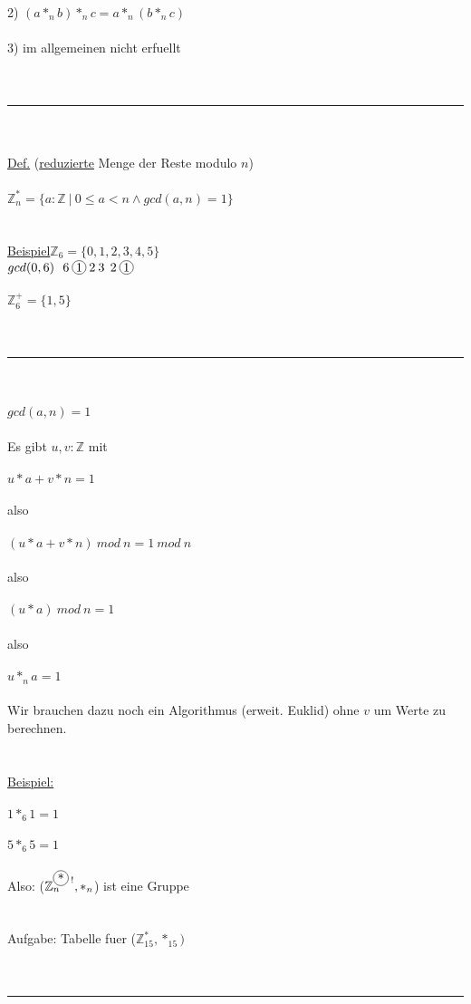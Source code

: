 \documentclass[18pt,a4paper]{article}
\newcommand*\circled[1]{\tikz[baseline=(char.base)]{
            \node[shape=circle,draw,inner sep=1pt] (char) {#1};}}
\newcommand{\tab}{\hspace*{2em}}
\begin{document}
2) $(a *_n b) *_n c = a *_n (b *_n c)$\\
\\
3) im allgemeinen nicht erfuellt\\
\\
\\
\rule{\textwidth}{0.4mm}\\
\\
\uline{Def.} (\uline{reduzierte} Menge der Reste modulo $n$)\\
\\
\tab $\mathbb{Z}_{n}^{*} = \{ a:\mathbb{Z}\:\vert\: 0 \leqslant a< n \wedge gcd(a,n) = 1\}$\\
\\
\\
\uline{Beispiel}\tab $\mathbb{Z}_6 = \{0,1,2,3,4,5\}$ \\
\tab \tab $gcd(0,6)\:\:\:6\: \circled{1}\: 2\: 3\:\: 2\: \circled{1}$\\
\\
\tab \tab $\mathbb{Z}_{6}^{+} = \{1,5\}$\\
\\
\\
\rule{\textwidth}{0.4mm}\\
\\
$gcd(a,n) = 1$\\
\\
Es gibt $u,v : \mathbb{Z}$ mit\\
\\
\tab $u*a + v*n =1$\\
\\
also\\
\\
\tab $(u*a + v*n)\: mod\: n =1 \: mod \: n$\\
\\
also\\
\\
\tab $(u*a)\: mod\: n =1$\\
\\
also\\
\\
\tab $u *_n a =1$\\
\\
Wir brauchen dazu noch ein Algorithmus (erweit. Euklid) ohne $v$ um Werte zu berechnen.\\
\\
\\
\uline{Beispiel:}\\
\\
$1 *_6 1 =1$\\
\\
$5 *_6 5 =1$\\
\\
Also: ($\mathbb{Z}_{n}^{\circled{*}\:!}, *_n$) ist eine Gruppe\\
\\
\\
Aufgabe: Tabelle fuer ($\mathbb{Z}_{15}^{*}, *_{15})$\\
\\
\\
\rule{\textwidth}{0.4mm}\\
\\
\end{document}

